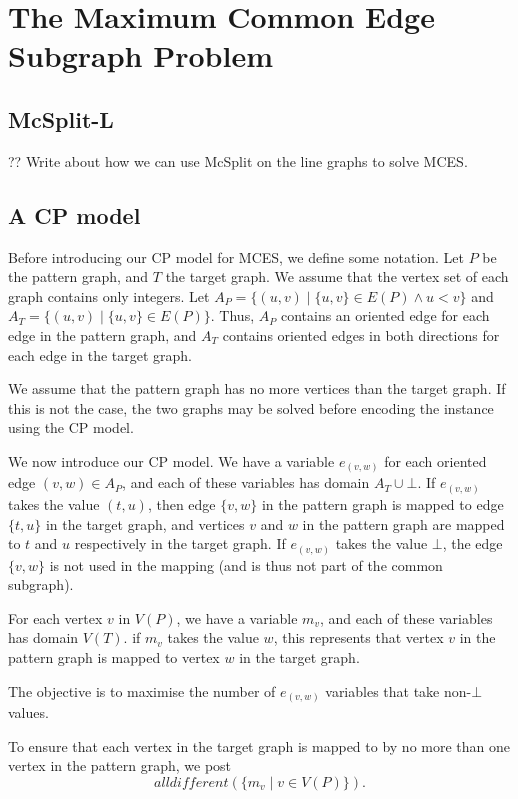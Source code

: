 \chapter{The Maximum Common Edge Subgraph Problem}
\label{c:mcsplite}

\section{McSplit-L}

?? Write about how we can use McSplit on the line graphs to solve MCES.

\section{A CP model}

Before introducing our CP model for MCES, we define some notation.  Let $P$ be the pattern graph,
and $T$ the target graph.  We assume that the vertex set of each graph contains only integers.
Let $A_P = \{(u,v) \mid \{u,v\} \in E(P) \wedge u < v \}$ and
    $A_T = \{(u,v) \mid \{u,v\} \in E(P) \}$.
Thus, $A_P$ contains an oriented edge for each edge in the pattern graph, and $A_T$ contains
oriented edges in both directions for each edge in the target graph.

We assume that the pattern graph has no more vertices than the target graph.  If this is not
the case, the two graphs may be solved before encoding the instance using the CP model.

We now introduce our CP model.  We have a variable $e_{(v,w)}$ for each oriented edge $(v,w) \in A_P$,
and each of these variables has domain $A_T \cup \bot$.  If $e_{(v,w)}$ takes the value $(t,u)$,
then edge $\{v,w\}$ in the pattern graph is mapped to edge $\{t,u\}$ in the target graph, and vertices
$v$ and $w$ in the pattern graph are mapped to $t$ and $u$ respectively in the target graph.
If $e_{(v,w)}$ takes the value $\bot$, the edge $\{v,w\}$ is not used in the mapping (and is thus not
part of the common subgraph).

For each vertex $v$ in $V(P)$, we have a variable $m_v$, and each of these variables has domain $V(T)$.
if $m_v$ takes the value $w$, this represents that vertex $v$ in the pattern graph is mapped to vertex
$w$ in the target graph.

The objective is to maximise the number of $e_{(v,w)}$ variables that take non-$\bot$ values.

To ensure that each vertex in the target graph is mapped to by no more than one vertex in the pattern graph,
we post
\[
\textit{alldifferent}(\{m_v \mid v \in V(P)\}).
\]

